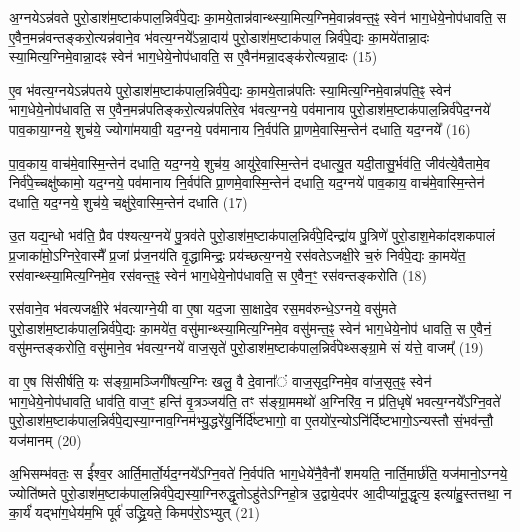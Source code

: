 अ॒ग्नये\-ऽन्न॑वते पुरो॒डाश॑म॒ष्टाक॑पाल॒न्निर्व॑पे॒द्यः का॒मये॒तान्न॑वान्थ्स्या॒मित्य॒ग्निमे॒वान्न॑वन्त॒ꣴ॒ स्वेन॑ भाग॒धेये॒नोप॑धावति॒ स ए॒वैन॒मन्न॑वन्तङ्करो॒त्यन्न॑वाने॒व भ॑वत्य॒ग्नये᳚\-ऽन्ना॒दाय॑ पुरो॒डाश॑म॒ष्टाक॑पाल॒ न्निर्व॑पे॒द्यः का॒मये॑तान्ना॒दः स्या॒मित्य॒ग्निमे॒वान्ना॒दꣴ स्वेन॑ भाग॒धेये॒नोप॑धावति॒ स ए॒वैन॑मन्ना॒दङ्क॑रोत्यन्ना॒दः (15)

ए॒व भ॑वत्य॒ग्नये\-ऽन्न॑पतये पुरो॒डाश॑म॒ष्टाक॑पाल॒न्निर्व॑पे॒द्यः का॒मये॒तान्न॑पतिः स्या॒मित्य॒ग्निमे॒वान्न॑पति॒ꣴ॒ स्वेन॑ भाग॒धेये॒नोप॑धावति॒ स ए॒वैन॒मन्न॑पतिङ्करो॒त्यन्न॑पतिरे॒व भ॑वत्य॒ग्नये॒ पव॑मानाय पुरो॒डाश॑म॒ष्टाक॑पाल॒न्निर्व॑पेद॒ग्नये॑ पाव॒काया॒ग्नये॒ शुच॑ये॒ ज्योगा॑मयावी॒ यद॒ग्नये॒ पव॑मानाय नि॒र्वप॑ति प्रा॒णमे॒वास्मि॒न्तेन॑ दधाति॒ यद॒ग्नये᳚ (16)

पा॒व॒काय॒ वाच॑मे॒वास्मि॒न्तेन॑ दधाति॒ यद॒ग्नये॒ शुच॑य॒ आयु॑रे॒वास्मि॒न्तेन॑ दधात्यु॒त यदी॒तासु॒र्भव॑ति॒ जीव॑त्ये॒वैतामे॒व निर्व॑पे॒च्चक्षु॑ष्कामो॒ यद॒ग्नये॒ पव॑मानाय नि॒र्वप॑ति प्रा॒णमे॒वास्मि॒न्तेन॑ दधाति॒ यद॒ग्नये॑ पाव॒काय॒ वाच॑मे॒वास्मि॒न्तेन॑ दधाति॒ यद॒ग्नये॒ शुच॑ये॒ चक्षु॑रे॒वास्मि॒न्तेन॑ दधाति (17)

उ॒त यद्य॒न्धो भव॑ति॒ प्रैव प॑श्यत्य॒ग्नये॑ पु॒त्रव॑ते पुरो॒डाश॑म॒ष्टाक॑पाल॒न्निर्व॑पे॒दिन्द्रा॑य पु॒त्रिणे॑ पुरो॒डाश॒मेका॑दशकपालं प्र॒जाका॑मो़॒\-ऽग्निरे॒वास्मै᳚ प्र॒जां प्र॑ज॒नय॑ति वृ॒द्धामिन्द्रः॒ प्रय॑च्छत्य॒ग्नये॒ रस॑वते\-ऽजक्षी॒रे च॒रुं निर्व॑पे॒द्यः का॒मये॑त॒ रस॑वान्थ्स्या॒मित्य॒ग्निमे॒व रस॑वन्त॒ꣴ॒ स्वेन॑ भाग॒धेये॒नोप॑धावति॒ स ए॒वैन॒ꣳ॒ रस॑वन्तङ्करोति (18)

रस॑वाने॒व भ॑वत्यजक्षी॒रे भ॑वत्याग्ने॒यी वा ए॒षा यद॒जा सा॒क्षादे॒व रस॒मव॑रुन्धे॒\-ऽग्नये॒ वसु॑मते पुरो॒डाश॑म॒ष्टाक॑पाल॒न्निर्व॑पे॒द्यः का॒मये॑त॒ वसु॑मान्थ्स्या॒मित्य॒ग्निमे॒व वसु॑मन्त॒ꣴ॒ स्वेन॑ भाग॒धेये॒नोप॑ धावति॒ स ए॒वैनं॒ वसु॑मन्तङ्करोति॒ वसु॑माने॒व भ॑वत्य॒ग्नये॑ वाज॒सृते॑ पुरो॒डाश॑म॒ष्टाक॑पाल॒न्निर्व॑पेथ्सङ्ग्रा॒मे सं य॑त्ते॒ वाजम्᳚ (19)

वा ए॒ष सि॑सीर्\mbox{}षति॒ यः स॑ङ्ग्रा॒मञ्जिगी॑षत्य॒ग्निः खलु॒ वै दे॒वाना᳚ं वाज॒सृद॒ग्निमे॒व वा॑ज॒सृत॒ꣴ॒ स्वेन॑ भाग॒धेये॒नोप॑धावति॒ धाव॑ति॒ वाज॒ꣳ॒ हन्ति॑ वृ॒त्रञ्जय॑ति॒ तꣳ स॑ङ्ग्रा॒ममथो॑ अ॒ग्निरि॑व॒ न प्र॑ति॒धृषे॑ भवत्य॒ग्नये᳚\-ऽग्नि॒वते॑ पुरो॒डाश॑म॒ष्टाक॑पाल॒न्निर्व॑पे॒द्यस्या॒ग्नाव॒ग्निम॑भ्यु॒द्धरे॑यु॒र्निर्दि॑ष्टभागो॒ वा ए॒तयो॑र॒न्यो\-ऽनि॑र्दिष्टभागो॒\-ऽन्यस्तौ सं॒भव॑न्तौ॒ यज॑मानम् (20)

अ॒भिसम्भ॑वतः॒ स ई᳚श्व॒र आर्ति॒मार्तो॒र्यद॒ग्नये᳚\-ऽग्नि॒वते॑ नि॒र्वप॑ति भाग॒धेये॑नै॒वैनौ॑ शमयति॒ नार्ति॒मार्छ॑ति॒ यज॑मानो॒\-ऽग्नये॒ ज्योति॑ष्मते पुरो॒डाश॑म॒ष्टाक॑पाल॒न्निर्व॑पे॒द्यस्या॒ग्निरुद्धृ॒तो\-ऽहु॑ते\-ऽग्निहो॒त्र उ॒द्वाये॒दप॑र आ॒दीप्या॑नू॒द्धृत्य॒ इत्या॑हु॒स्तत्तथा॒ न का॒र्यं॑ यद्भा॑ग॒धेय॑म॒भि पूर्व॑ उद्ध्रि॒यते॒ किमप॑रो॒\-ऽभ्युत् (21)

